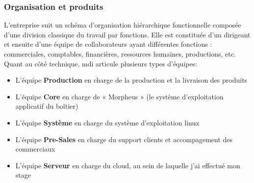         \subsubsection{Organisation et produits}
        L’entreprise suit un schéma d’organisation hiérarchique fonctionnelle composée d’une division classique du 
        travail par fonctions. Elle est constituée d’un dirigeant et ensuite d’une équipe de collaborateurs ayant 
        différentes fonctions : commerciales, comptables, financières, ressources humaines, productions, etc. 
           Quant au côté technique, \gls{mdi} articule plusieurs types d'équipes: \\
            \begin{itemize}
                \renewcommand{\labelitemi}{$\bullet$}
                \item L’équipe \textbf{Production} en charge de la production et la livraison des produits
                \item L’équipe \textbf{Core} en charge de « Morpheus » (le système d’exploitation applicatif du boîtier)
                \item L’équipe \textbf{Système} en charge du système d'exploitation linux
                \item L’équipe \textbf{Pre-Sales} en charge du support clients et accompagement des commerciaux
                \item L’équipe \textbf{Serveur} en charge du cloud, au sein de laquelle j'ai effectué mon stage
            \end{itemize} 
            
            \vspace{0.5cm}

